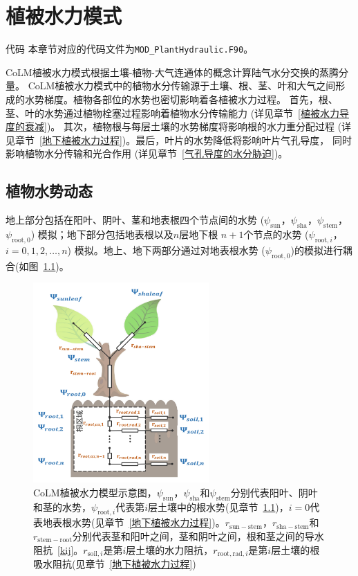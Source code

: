 \chapter{植被水力模式}
\begin{mymdframed}{代码}
  本章节对应的代码文件为\texttt{MOD\_PlantHydraulic.F90}。
\end{mymdframed}

CoLM植被水力模式根据土壤-植物-大气连通体的概念计算陆气水分交换的蒸腾分量。
CoLM植被水力模式中的植物水分传输源于土壤、根、茎、叶和大气之间形成的水势梯度。植物各部位的水势也密切影响着各植被水力过程。
首先，根、茎、叶的水势通过植物栓塞过程影响着植物水分传输能力 (详见章节~\ref{植被水力导度的衰减})。
其次，植物根与每层土壤的水势梯度将影响根的水力重分配过程 (详见章节~\ref{地下植被水力过程})。最后，叶片的水势降低将影响叶片气孔导度，
同时影响植物水分传输和光合作用 (详见章节~\ref{气孔导度的水分胁迫})。


\section{植物水势动态}\label{植物水势动态}
地上部分包括在阳叶、阴叶、茎和地表根四个节点间的水势 ($\psi_{\mathrm{sun}}$，$\psi_{\mathrm{sha}}$，$\psi_{\mathrm{stem}}$，$\psi_{\mathrm{root,0}}$)
%
模拟；地下部分包括地表根以及$n$层地下根 $n+1$个节点的水势 ($\psi_{\mathrm{root},i}$，$i=0,1,2,\ldots,n$) 模拟。地上、地下两部分通过对地表根水势
($\psi_{\mathrm{root,0}}$)的模拟进行耦合(如图~\ref{fig:CoLM植被水力模型示意图})。

{
  \begin{figure}[htb]
    \centering
    \includegraphics[width=0.6\textwidth]{Figures/植被水力模式/CoLM植被水力模型示意图.png}
    \caption{CoLM植被水力模型示意图，$\psi_{\mathrm{sun}}$，$\psi_{\mathrm{sha}}$和$\psi_{\mathrm{stem}}$分别代表阳叶、阴叶和茎的水势，$\psi_{\mathrm{root},i}$代表第$i$层土壤中的根水势(见章节~\ref{植物水势动态})，$i=0$代表地表根水势(见章节~\ref{地下植被水力过程})。$r_{\mathrm{sun-stem}}$，$r_{\mathrm{sha-stem}}$和$r_{\mathrm{stem-root}}$分别代表茎和阳叶之间，茎和阴叶之间，根和茎之间的导水阻抗~\eqref{kij}。$r_{\mathrm{soil},i}$是第$i$层土壤的水力阻抗，$r_{\mathrm{root,rad},i}$是第$i$层土壤的根吸水阻抗(见章节~\ref{地下植被水力过程})}
    \label{fig:CoLM植被水力模型示意图}
  \end{figure}
}


